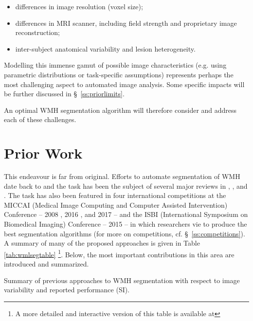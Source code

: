 \begin{enumerate}[itemsep=0pt,topsep=0pt]
\begin{itemize}[itemsep=0pt,topsep=0pt]
      \item differences in image resolution (voxel size);
      \item differences in MRI scanner, including field strength and proprietary image reconstruction;
      \item inter-subject anatomical variability and lesion heterogeneity.
    \end{itemize}
    Modelling this immense gamut of possible image characteristics (e.g. using parametric distributions or task-specific assumptions) represents perhaps the most challenging aspect to automated image analysis.
    Some specific impacts will be further discussed in \S\ \ref{ss:priorlimits}.
\end{enumerate}
An optimal WMH segmentation algorithm will therefore consider and address each of these challenges.
\section{Prior Work}
This endeavour is far from original.
Efforts to automate segmentation of WMH date back to \citeyear{Kapouleas1990} \cite{Kapouleas1990} and the task has been the subject of several major reviews in \citeyear{Llado2012} \cite{Llado2012,Mortazavi2012}, \citeyear{Garcia-Lorenzo2013} \cite{Garcia-Lorenzo2013}, and \citeyear{Caligiuri2015} \cite{Caligiuri2015}.
The task has also been featured in four international competitions at the
MICCAI (Medical Image Computing and Computer Assisted Intervention) Conference -- 2008 \cite{MSSEG2008}, 2016 \cite{MSSEG2016}, and 2017 \cite{WMHSEG2017} --
and the
ISBI (International Symposium on Biomedical Imaging) Conference -- 2015 \cite{MSISBI2015} --
in which researchers vie to produce the best segmentation algorithms (for more on competitions, cf. \S\ \ref{ss:competitions}).
A summary of many of the proposed approaches is given in Table \ref{tab:wmlsegtable}%
\footnote{A more detailed and interactive version of this table is available at }.
Below, the most important contributions in this area are introduced and summarized.
\begin{table}
  \caption{Summary of previous approaches to WMH segmentation with respect to image variability and reported performance (SI).}
  \footnotesize{\centering{}}
  \label{tab:wmlsegtable}
\end{table}
